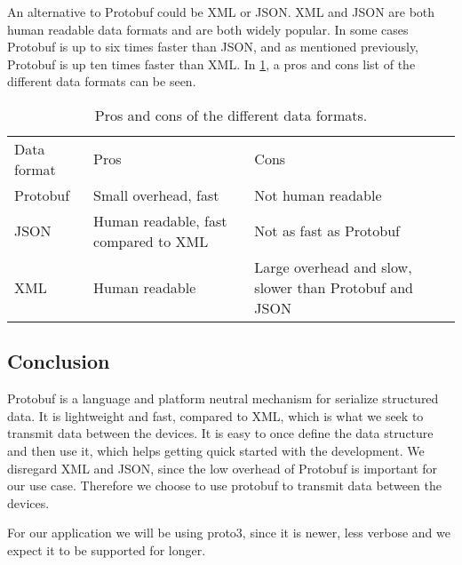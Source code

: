 An alternative to Protobuf could be XML or JSON.
XML and JSON are both human readable data formats and are both widely popular.
In some cases Protobuf is up to six times faster than JSON, and as mentioned previously, Protobuf is up ten times faster than XML\cite{json_slow}.
In \cref{tab:format_pros_cons}, a pros and cons list of the different data formats can be seen.

\begin{table}
    \begin{tabularx}{\textwidth}{XXX}\toprule
        Data format & Pros & Cons \\
        Protobuf    & Small overhead, fast  & Not human readable \\
        JSON        & Human readable, \newline fast compared to XML  & Not as fast as Protobuf\\
        XML         & Human readable        & Large overhead and slow, slower than Protobuf and JSON \\
    \end{tabularx}
    \caption{Pros and cons of the different data formats.}
    \label{tab:format_pros_cons}
\end{table}

\subsection{Conclusion}
Protobuf is a language and platform neutral mechanism for serialize structured data.
It is lightweight and fast, compared to XML, which is what we seek to transmit data between the devices.
It is easy to once define the data structure and then use it, which helps getting quick started with the development.
We disregard XML and JSON, since the low overhead of Protobuf is important for our use case.
Therefore we choose to use protobuf to transmit data between the devices.

For our application we will be using proto3, since it is newer, less verbose and we expect it to be supported for longer.
